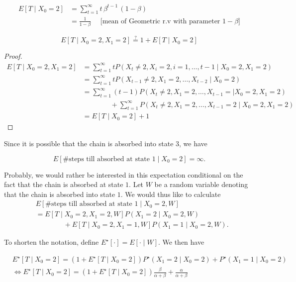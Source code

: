 \documentclass{article}
\theoremstyle{definition}
\begin{document}
\begin{align*}
E\left[T \mid X_0 = 2 \right]
&= \sum_{t=1}^\infty t \,  \beta^{t-1}\,(1-\beta) \\
&= \frac{1}{1-\beta} \quad \text{ [mean of Geometric r.v with parameter $1-\beta$]}
\end{align*}

$$
E \left[ T \mid X_0 = 2, X_1 = 2 \right] \overset{?}{=} 1 + E \left[ T \mid X_0 = 2 \right]
$$

\begin{proof}

\begin{align*}
E \left[ T \mid X_0 = 2, X_1 = 2 \right]
&= \sum_{t=1}^\infty t P \left( X_t \ne 2, X_i = 2, i=1,\ldots,t-1 \mid X_0 = 2, X_1 = 2 \right) \\
&= \sum_{t=1}^\infty t P \left( X_{t-1} \ne 2, X_1 = 2, \ldots, X_{t-2} \mid X_0 = 2 \right) \\
&= \sum_{t=1}^\infty (t-1) P \left( X_t \ne 2,  X_1 = 2, \ldots, X_{t-1} = \mid X_0 = 2, X_1 = 2 \right) \\
&\qquad \qquad + \sum_{t=1}^\infty P \left( X_t \ne 2, X_1 = 2, \ldots, X_{t-1} = 2 \mid X_0 = 2, X_1 = 2 \right) \\
&= E\left[T \mid X_0 = 2 \right] +1
\end{align*}

\end{proof}

Since it is possible that the chain is absorbed into state $3$, we have

$$
E \left[ \text{\# steps till absorbed at state 1} \mid X_0 = 2 \right] = \infty.
$$

Probably, we would rather be interested in this expectation conditional on the fact that the chain is absorbed at state $1$. Let $W$ be a random variable denoting that the chain is absorbed into state $1$. We would thus like to calculate
\begin{align*}
&E \left[ \text{\# steps till absorbed at state 1} \mid X_0 = 2, W \right] \\
&= E \left[ T \mid X_0 = 2, X_1 = 2, W \right] P(X_1 = 2 \mid X_0 = 2, W) \\
&\qquad \qquad + E \left[ T \mid X_0 = 2, X_1 = 1, W \right] P(X_1 = 1 \mid X_0 = 2, W).
\end{align*}

To shorten the notation, define $E^\star[\cdot] = E[\cdot \mid W]$. We then have

\begin{align*}
&E^\star \left[ T \mid X_0 =2 \right] = (1 + E^\star \left[ T \mid X_0 = 2 \right]) P^\star (X_1 =2 \mid X_0 = 2) + P^\star (X_1 = 1 \mid X_0 =2) \\
&\iff E^\star \left[ T \mid X_0 =2 \right] = (1 + E^\star \left[ T \mid X_0 = 2 \right]) \frac{\beta}{\alpha+\beta} + \frac{\alpha}{\alpha+\beta}
\end{align*}
\end{document}
